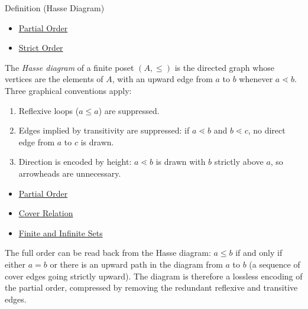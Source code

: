 
\begin{definitionbox}{Definition (Hasse Diagram)}

\begin{dependencies}
\begin{itemize}
  \item \hyperref[def:partial-order]{Partial Order}
  \item \hyperref[def:strict-order]{Strict Order}
\end{itemize}
\end{dependencies}
\begin{definition}\label{def:hasse}
The \emph{Hasse diagram} of a finite poset $(A, \leq)$ is the directed graph
whose vertices are the elements of $A$, with an upward edge from $a$ to $b$
whenever $a \lessdot b$.  Three graphical conventions apply:
\begin{enumerate}[label=(\roman*)]
  \item Reflexive loops ($a \leq a$) are suppressed.
  \item Edges implied by transitivity are suppressed: if $a \lessdot b$ and
        $b \lessdot c$, no direct edge from $a$ to $c$ is drawn.
  \item Direction is encoded by height: $a \lessdot b$ is drawn with $b$
        strictly above $a$, so arrowheads are unnecessary.
\end{enumerate}
\end{definition}
\end{definitionbox}

\begin{dependencies}
\begin{itemize}
  \item \hyperref[def:partial-order]{Partial Order}
  \item \hyperref[def:cover-relation]{Cover Relation}
  \item \hyperref[def:finite-infinite]{Finite and Infinite Sets}
\end{itemize}
\end{dependencies}

\begin{remark*}
\label{rem:hasse-recovery}
The full order can be read back from the Hasse diagram: $a \leq b$ if and
only if either $a = b$ or there is an upward path in the diagram from $a$ to
$b$ (a sequence of cover edges going strictly upward).  The diagram is therefore
a lossless encoding of the partial order, compressed by removing the redundant
reflexive and transitive edges.
\end{remark*}

